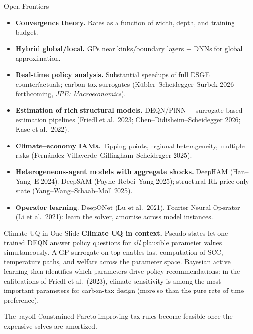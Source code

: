 \documentclass[aspectratio=169,11pt]{beamer}
\begin{document}
\begin{frame}{Open Frontiers}
\small
\begin{itemize}
    \item \textbf{Convergence theory.}  Rates as a function of width, depth, and training budget.
    \item \textbf{Hybrid global/local.}  GPs near kinks/boundary layers + DNNs for global approximation.
    \item \textbf{Real-time policy analysis.}  Substantial speedups of full DSGE counterfactuals; carbon-tax surrogates (K\"ubler--Scheidegger--Surbek 2026 forthcoming, \emph{JPE: Macroeconomics}).
    \item \textbf{Estimation of rich structural models.}  DEQN/PINN $+$ surrogate-based estimation pipelines (Friedl et al.\ 2023; Chen--Didisheim--Scheidegger 2026; Kase et al.\ 2022).
    \item \textbf{Climate--economy IAMs.}  Tipping points, regional heterogeneity, multiple risks (Fern\'andez-Villaverde--Gillingham--Scheidegger 2025).
    \item \textbf{Heterogeneous-agent models with aggregate shocks.}  DeepHAM (Han--Yang--E 2024); DeepSAM (Payne--Rebei--Yang 2025); structural-RL price-only state (Yang--Wang--Schaab--Moll 2025).
    \item \textbf{Operator learning.}  DeepONet (Lu et al.\ 2021), Fourier Neural Operator (Li et al.\ 2021): learn the solver, amortise across model instances.
\end{itemize}
\end{frame}

\begin{frame}{Climate UQ in One Slide}
\textbf{Climate UQ in context.}  Pseudo-states let one trained DEQN answer policy questions for \emph{all} plausible parameter values simultaneously.  A GP surrogate on top enables fast computation of SCC, temperature paths, and welfare across the parameter space.  Bayesian active learning then identifies which parameters drive policy recommendations: in the calibrations of Friedl et al.\ (2023), climate sensitivity is among the most important parameters for carbon-tax design (more so than the pure rate of time preference).

\vspace{0.25cm}
\begin{exampleblock}{The payoff}
Constrained Pareto-improving tax rules become feasible once the expensive solves are amortized.
\end{exampleblock}
\end{frame}
\end{document}
